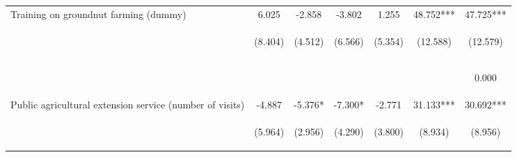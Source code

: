 \begin{center}
\begin{tabular}{lcccccc}
Training on groundnut farming (dummy) & 6.025 & -2.858 & -3.802 & 1.255 & 48.752*** & 47.725*** \\
 & \begin{footnotesize}(8.404)\end{footnotesize} & \begin{footnotesize}(4.512)\end{footnotesize} & \begin{footnotesize}(6.566)\end{footnotesize} & \begin{footnotesize}(5.354)\end{footnotesize} & \begin{footnotesize}(12.588)\end{footnotesize} & \begin{footnotesize}(12.579)\end{footnotesize} \\
\vspace{4pt} & \begin{footnotesize}[0.473]\end{footnotesize} & \begin{footnotesize}[0.526]\end{footnotesize} & \begin{footnotesize}[0.563]\end{footnotesize} & \begin{footnotesize}[0.815]\end{footnotesize} & \begin{footnotesize}[0.000]\end{footnotesize} & \begin{footnotesize}0.000\end{footnotesize} \\
Public agricultural extension service (number of visits) & -4.887 & -5.376* & -7.300* & -2.771 & 31.133*** & 30.692*** \\
 & \begin{footnotesize}(5.964)\end{footnotesize} & \begin{footnotesize}(2.956)\end{footnotesize} & \begin{footnotesize}(4.290)\end{footnotesize} & \begin{footnotesize}(3.800)\end{footnotesize} & \begin{footnotesize}(8.934)\end{footnotesize} & \begin{footnotesize}(8.956)\end{footnotesize} \\

\end{tabular}
\end{center}
